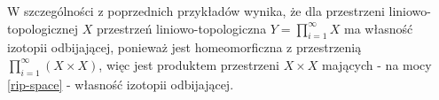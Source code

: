 \begin{ex}
  W szczególności z poprzednich przykładów wynika, że dla przestrzeni liniowo-topologicznej $X$ przestrzeń liniowo-topologiczna $Y = \prod_{i=1}^\infty X$ ma własność izotopii odbijającej, ponieważ jest homeomorficzna z przestrzenią $\prod_{i=1}^\infty (X \times X)$, więc jest produktem przestrzeni $X \times X$ mających - na mocy \ref{rip-space} - własność izotopii odbijającej.
\end{ex}


